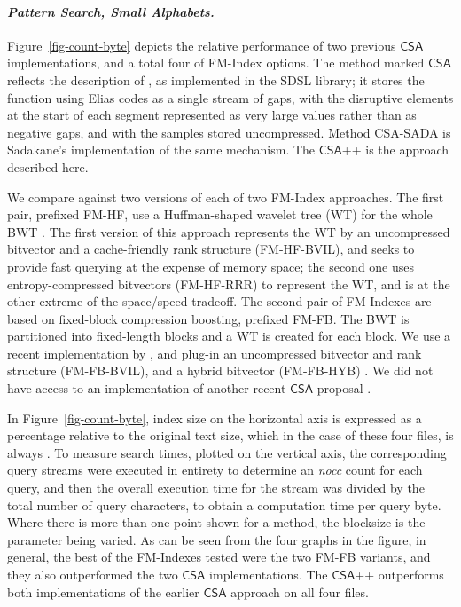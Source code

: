 \documentclass{llncs}
\newcommand{\var}[1]{\mbox{\em #1\/}}
\newcommand{\myparagraph}[1]{\paragraph*{\normalsize\it#1.}}
\newcommand{\CSA}[0]{\ensuremath{\mathsf{CSA}}}
\begin{document}
\myparagraph{Pattern Search, Small Alphabets}

Figure~\ref{fig-count-byte} depicts the relative performance of two
previous {\CSA} implementations, and a total four of FM-Index
options.
The method marked {\CSA} reflects the description of
{\cite{s-jalg03}}, as implemented in the SDSL library; it stores the
 function using Elias  codes as a single stream of
gaps, with the disruptive elements at the start of each segment
represented as very large values rather than as negative gaps, and
with the samples stored uncompressed.
Method CSA-SADA is Sadakane's implementation of the same
mechanism.
The {\CSA++} is the approach described here.

We compare against two versions of each of two FM-Index approaches.
The first pair, prefixed FM-HF, use a Huffman-shaped wavelet tree
(WT) for the whole BWT {\citep{mn05cpm}}.
The first version of this approach represents the WT by an
uncompressed bitvector and a cache-friendly rank structure
(FM-HF-BVIL), and seeks to provide fast querying at the expense of
memory space; the second one uses entropy-compressed bitvectors
(FM-HF-RRR) to represent the WT, and is at the other extreme of the
space/speed tradeoff.
The second pair of FM-Indexes are based on fixed-block compression
boosting, prefixed FM-FB.
The BWT is partitioned into fixed-length blocks and a WT is created
for each block.
We use a recent implementation by {\citet{gkkpp2016dcc}}, and plug-in
an uncompressed bitvector and rank structure (FM-FB-BVIL), and a
hybrid bitvector (FM-FB-HYB) {\citep{kkp14dcc}}.
We did not have access to an implementation of another recent {\CSA}
proposal {\citep{aks15nsdi}}.

In Figure~\ref{fig-count-byte}, index size on the horizontal axis is
expressed as a percentage relative to the original text size, which
in the case of these four files, is always .
To measure search times, plotted on the vertical axis, the
corresponding query streams were executed in entirety to determine an
{\var{nocc}} count for each query, and then the overall execution
time for the stream was divided by the total number of query
characters, to obtain a computation time per query byte.
Where there is more than one point shown for a method, the blocksize
 is the parameter being varied.
As can be seen from the four graphs in the figure, in general, the
best of the FM-Indexes tested were the two FM-FB variants, and they
also outperformed the two {\CSA} implementations.
The {\CSA++} outperforms both implementations of the earlier
{\CSA} approach on all four files.
\end{document}
